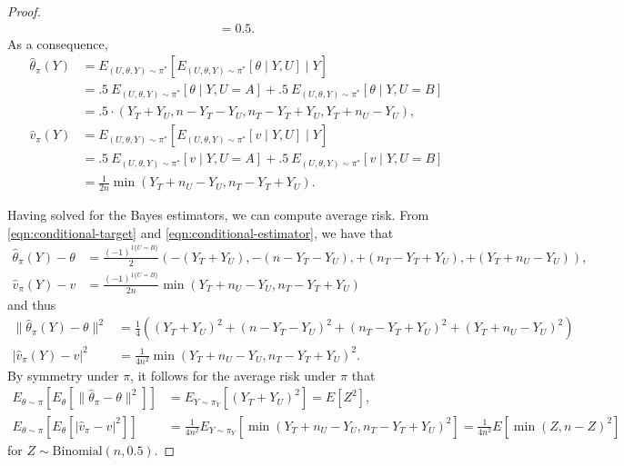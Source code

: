 \documentclass[12pt,reqno]{amsart}
\theoremstyle{theorem}
\theoremstyle{definition}
\newcommand{\0}{\mathbf{0}}
\newcommand{\1}{\mathbf{1}}
\begin{document}
\begin{proof}
\begin{align*}
        = 0.5.
    \end{align*}
    As a consequence,
    \begin{equation}
    \label{eqn:conditional-estimator}
        \begin{aligned}
        \hat{\theta}_\pi(Y) &= E_{(U,\theta,Y) \sim \pi^*}[E_{(U,\theta,Y) \sim \pi^*}[\theta \mid Y, U] \mid Y]
        \\
        &= .5 \: E_{(U,\theta,Y) \sim \pi^*}[\theta \mid Y, U = A] + .5 \: E_{(U,\theta,Y) \sim \pi^*}[\theta \mid Y, U = B]
        \\
        &= .5 \cdot (Y_T + Y_U, n - Y_T - Y_U, n_T - Y_T + Y_U, Y_T + n_U - Y_U),
        \\
        \hat{v}_\pi(Y) &= E_{(U,\theta,Y) \sim \pi^*}[E_{(U,\theta,Y) \sim \pi^*}[v \mid Y, U] \mid Y]
        \\
        &= .5 \: E_{(U,\theta,Y) \sim \pi^*}[v \mid Y, U = A] + .5 \: E_{(U,\theta,Y) \sim \pi^*}[v \mid Y, U = B]
        \\
        &= \frac{1}{2 n} \min(Y_T + n_U - Y_U, n_T - Y_T + Y_U).
    \end{aligned}
    \end{equation}

    Having solved for the Bayes estimators, we can compute average risk.
    From \eqref{eqn:conditional-target} and \eqref{eqn:conditional-estimator}, we have that
    \begin{align*}
        \hat{\theta}_\pi(Y) - \theta
        &=  \frac{(-1)^{1\{U=B\}}}{2} (-(Y_T + Y_U), -(n - Y_T - Y_U), +(n_T - Y_T + Y_U), +(Y_T + n_U - Y_U)),
        \\
        \hat{v}_\pi(Y) - v
        &= \frac{(-1)^{1\{U=B\}}}{2n}  \min(Y_T + n_U - Y_U, n_T - Y_T + Y_U)
    \end{align*}
    and thus
    \begin{align*}
        \| \hat{\theta}_\pi(Y) - \theta \|^2
        &= \frac{1}{4} \left( (Y_T + Y_U)^2 + (n - Y_T - Y_U)^2 + (n_T - Y_T + Y_U)^2 + (Y_T + n_U - Y_U)^2 \right)
        \\
        | \hat{v}_\pi(Y) - v |^2
        &= \frac{1}{4 n^2}  \min(Y_T + n_U - Y_U, n_T - Y_T + Y_U)^2.
    \end{align*}
    By symmetry under $\pi$, it follows for the average risk under $\pi$ that
    \begin{align*}
        E_{\theta \sim \pi}[ E_\theta [\| \hat{\theta}_\pi - \theta \|^2]]
        &= E_{Y \sim \pi_Y}[(Y_T + Y_U)^2]
        = E[Z^2],
        \\
        E_{\theta \sim \pi} [E_\theta [| \hat{v}_\pi - v |^2]]
        &= \frac{1}{4 n^2} E_{Y \sim \pi_Y}[\min(Y_T {+} n_U {-} Y_U, n_T {-} Y_T {+} Y_U)^2]
        = \frac{1}{4 n^2} E[\min(Z, n {-} Z)^2]
    \end{align*}
    for $Z \sim \text{Binomial}(n,0.5)$.


\end{proof}
\end{document}
